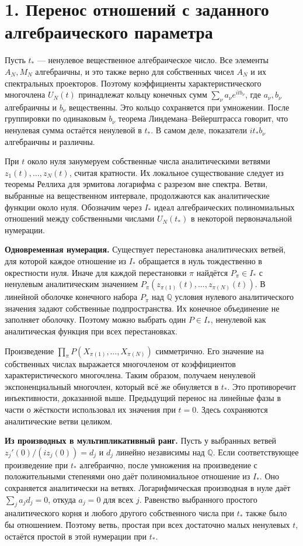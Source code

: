 \documentclass[11pt,a4paper]{article}
\newcommand{\sect}[1]{\section*{\sffamily\color{ink}#1}}
\newcommand{\subt}[1]{\par\medskip\noindent\textbf{#1.}\quad}
\newcommand{\QQ}{\mathbb Q}
\begin{document}
\newpage
\sect{1. Перенос отношений с заданного алгебраического параметра}
Пусть \(t_*\) --- ненулевое вещественное алгебраическое число. Все элементы \(A_N,M_N\) алгебраичны, и это также верно для собственных чисел \(A_N\) и их спектральных проекторов. Поэтому коэффициенты характеристического многочлена \(U_N(t)\) принадлежат кольцу конечных сумм \(\sum_\nu a_\nu e^{itb_\nu}\), где \(a_\nu,b_\nu\) алгебраичны и \(b_\nu\) вещественны. Это кольцо сохраняется при умножении. После группировки по одинаковым \(b_\nu\) теорема Линдемана--Вейерштрасса говорит, что ненулевая сумма остаётся ненулевой в \(t_*\). В самом деле, показатели \(it_*b_\nu\) алгебраичны и различны.

При \(t\) около нуля занумеруем собственные числа аналитическими ветвями \(z_1(t),\ldots,z_N(t)\), считая кратности. Их локальное существование следует из теоремы Реллиха для эрмитова логарифма с разрезом вне спектра. Ветви, выбранные на вещественном интервале, продолжаются как аналитические функции около нуля. Обозначим через \(I_*\) идеал алгебраических полиномиальных отношений между собственными числами \(U_N(t_*)\) в некоторой первоначальной нумерации.

\subt{Одновременная нумерация}
Существует перестановка аналитических ветвей, для которой каждое отношение из \(I_*\) обращается в нуль тождественно в окрестности нуля. Иначе для каждой перестановки \(\pi\) найдётся \(P_\pi\in I_*\) с ненулевым аналитическим значением \(P_\pi(z_{\pi(1)}(t),\ldots,z_{\pi(N)}(t))\). В линейной оболочке конечного набора \(P_\pi\) над \(\QQ\) условия нулевого аналитического значения задают собственные подпространства. Их конечное объединение не заполняет оболочку. Поэтому можно выбрать один \(P\in I_*\), ненулевой как аналитическая функция при всех перестановках.

Произведение \(\prod_\pi P(X_{\pi(1)},\ldots,X_{\pi(N)})\) симметрично. Его значение на собственных числах выражается многочленом от коэффициентов характеристического многочлена. Таким образом, получаем ненулевой экспоненциальный многочлен, который всё же обнуляется в \(t_*\). Это противоречит инъективности, доказанной выше. Предыдущий перенос на линейные фазы в части о жёсткости использовал их значения при \(t=0\). Здесь сохраняются аналитические ветви целиком.

\subt{Из производных в мультипликативный ранг}
Пусть у выбранных ветвей \(z_j'(0)/(iz_j(0))=d_j\) и \(d_j\) линейно независимы над \(\QQ\). Если соответствующее произведение при \(t_*\) алгебраично, после умножения на произведение с положительными степенями оно даёт полиномиальное отношение из \(I_*\). Оно сохраняется аналитически на ветвях. Логарифмическая производная в нуле даёт \(\sum_j a_j d_j=0\), откуда \(a_j=0\) для всех \(j\). Равенство выбранного простого аналитического корня и любого другого собственного числа при \(t_*\) также было бы отношением. Поэтому ветвь, простая при всех достаточно малых ненулевых \(t\), остаётся простой в этой нумерации при \(t_*\).
\end{document}

